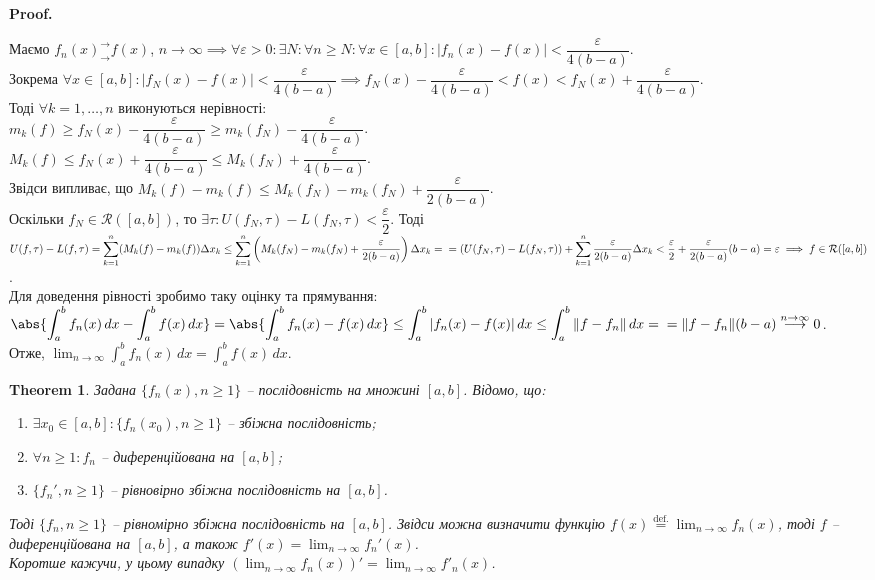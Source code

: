 \documentclass[a4paper, 10pt]{article}
\makeatletter
\def\huge{\displaystyle}
\theoremstyle{theoremdd}
\newtheorem{theorem}{Theorem}[subsection]
\theoremstyle{theoremdd}
\theoremstyle{theoremdd}
\theoremstyle{theoremdd}
\theoremstyle{theoremdd}
\theoremstyle{theoremdd}
\theoremstyle{theoremdd}
\theoremstyle{theoremdd}
\theoremstyle{theoremdd}
\renewenvironment{proof}[1][Proof.\\]{\par
\pushQED{\hfill \qed}%
\normalfont \topsep6\p@\@plus6\p@\relax
\trivlist
\item\relax
{\bfseries
#1\@addpunct{.}}\hspace\labelsep\ignorespaces
}{%
\popQED\endtrivlist\@endpefalse
}
\makeatother
\begin{document}
\begin{proof}
Маємо $f_n(x)^\rightarrow_\rightarrow f(x)$, $n \to \infty \implies \forall \varepsilon > 0: \exists N: \forall n \geq N: \forall x \in [a,b]: |f_n(x)-f(x)| < \dfrac{\varepsilon}{4(b-a)}$.\\
Зокрема $\forall x \in [a,b]: |f_N(x) - f(x)| < \dfrac{\varepsilon}{4(b-a)} \implies f_N(x) - \dfrac{\varepsilon}{4(b-a)} < f(x) < f_N(x) + \dfrac{\varepsilon}{4(b-a)}$. \\
Тоді $\forall k = 1,\dots,n$ виконуються нерівності:\\
$m_k(f) \geq f_N(x) - \dfrac{\varepsilon}{4(b-a)} \geq m_k(f_N) - \dfrac{\varepsilon}{4(b-a)}$.\\
$M_k(f) \leq f_N(x) + \dfrac{\varepsilon}{4(b-a)} \leq M_k(f_N) + \dfrac{\varepsilon}{4(b-a)}$.\\
Звідси випливає, що $M_k(f) - m_k(f) \leq M_k(f_N) - m_k(f_N) + \dfrac{\varepsilon}{2(b-a)}$.\\
Оскільки $f_N \in \mathcal{R}([a,b])$, то $\exists \tau: U(f_N,\tau) - L(f_N,\tau) < \dfrac{\varepsilon}{2}$. Тоді\\
$U(f,\tau) - L(f,\tau) = \huge\sum_{k=1}^n (M_k(f)-m_k(f))\Delta x_k \leq \huge\sum_{k=1}^n \left( M_k(f_N) - m_k(f_N) + \dfrac{\varepsilon}{2(b-a)} \right) \Delta x_k = \\ = (U(f_N,\tau) - L(f_N,\tau)) + \huge\sum_{k=1}^n \dfrac{\varepsilon}{2(b-a)}\Delta x_k < \dfrac{\varepsilon}{2} + \dfrac{\varepsilon}{2(b-a)} (b-a) = \varepsilon \implies f \in \mathcal{R}([a,b])$.\\
Для доведення рівності зробимо таку оцінку та прямування:\\
$\huge\abs{\int_a^b f_n(x)\,dx - \int_a^b f(x)\,dx} = \abs{\int_a^b f_n(x)-f(x)\,dx} \leq \int_a^b |f_n(x)-f(x)|\,dx \leq \int_a^b \|f-f_n\|\,dx = \\ = \|f-f_n\| (b-a) \overset{n \to \infty}{\longrightarrow} 0$.\\
Отже, $\huge\lim_{n \to \infty} \int_a^b f_n(x)\,dx = \int_a^b f(x)\,dx$.
\end{proof}

\begin{theorem}
\label{differentiation_of_funcitonal_sequence}
Задана $\{f_n(x), n \geq 1\}$ -- послідовність на множині $[a,b]$. Відомо, що:
\begin{enumerate}[nosep,wide=0pt,label={\arabic*)}]
\item $\exists x_0 \in [a,b]: \{f_n(x_0), n \geq 1\}$ -- збіжна послідовність;
\item $\forall n \geq 1: f_n$ -- диференційована на $[a,b]$;
\item $\{f_n', n \geq 1\}$ -- рівновірно збіжна послідовність на $[a,b]$.
\end{enumerate}
Тоді $\{f_n, n \geq 1\}$ -- рівномірно збіжна послідовність на $[a,b]$. Звідси можна визначити функцію $f(x) \overset{\text{def.}}{=} \displaystyle\lim_{n \to \infty} f_n(x)$, тоді $f$ -- диференційована на $[a,b]$, а також $f'(x) = \displaystyle\lim_{n \to \infty} f_n'(x)$.\\
Коротше кажучи, у цьому випадку $\displaystyle\left( \lim_{n \to \infty} f_n(x) \right)' = \lim_{n \to \infty} f'_n(x)$.
\end{theorem}
\end{document}
